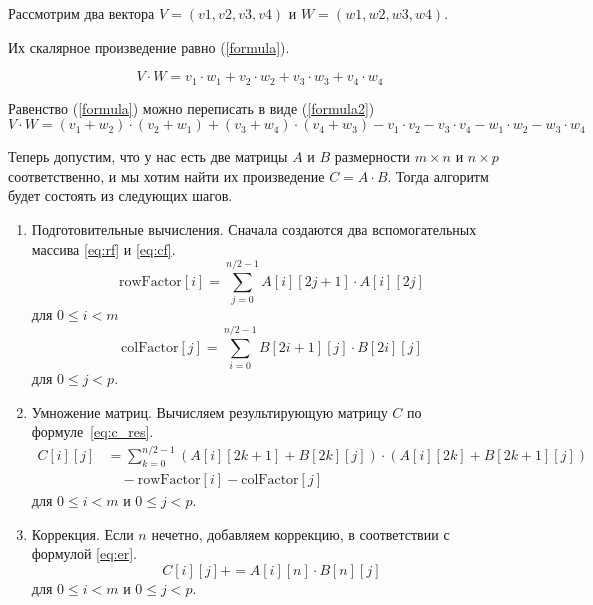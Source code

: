 Рассмотрим два вектора $V = (v1, v2, v3, v4)$ и $W = (w1, w2, w3, w4)$.  

Их скалярное произведение равно (\ref{formula}).

\begin{equation} \label{formula}
	V \cdot W=v_1 \cdot w_1 + v_2 \cdot w_2 + v_3 \cdot w_3 + v_4 \cdot w_4
\end{equation}

Равенство (\ref{formula}) можно переписать в виде (\ref{formula2}) 
\begin{equation} \label{formula2}
	V \cdot W=(v_1 + w_2) \cdot (v_2 + w_1) + (v_3 + w_4) \cdot (v_4 + w_3) - v_1 \cdot v_2 - v_3 \cdot v_4 - w_1 \cdot w_2 - w_3 \cdot w_4
\end{equation}

Теперь допустим, что у нас есть две матрицы $A$ и $B$ размерности $m \times n$ и $n \times p$ соответственно, и мы хотим найти их произведение $C = A \cdot B$.
Тогда алгоритм будет состоять из следующих шагов.

\begin{enumerate}
	\item Подготовительные вычисления. Сначала создаются два вспомогательных массива \eqref{eq:rf} и \eqref{eq:cf}.
	\begin{equation}
	\label{eq:rf}
	\text{{rowFactor}}[i] = \sum_{j=0}^{n/2 - 1} A[i][2j+1] \cdot A[i][2j]
	\end{equation}
	для \(0 \leq i < m\)
	\begin{equation}
	\label{eq:cf}
	\text{{colFactor}}[j] = \sum_{i=0}^{n/2 - 1} B[2i+1][j] \cdot B[2i][j]
	\end{equation}
	для \(0 \leq j < p\).
	
	\item Умножение матриц. Вычисляем результирующую матрицу $C$ по формуле~\eqref{eq:c_res}.
	\begin{equation}
		\label{eq:c_res}
		\begin{aligned}
			C[i][j] &= \sum_{k=0}^{n/2 - 1} (A[i][2k+1] + B[2k][j]) \cdot (A[i][2k] + B[2k+1][j]) \\
			&\quad - \text{{rowFactor}}[i] - \text{{colFactor}}[j]
		\end{aligned}
	\end{equation}
	для \(0 \leq i < m\) и \(0 \leq j < p\).
	
	\item Коррекция. Если \(n\) нечетно, добавляем коррекцию, в соответствии с формулой \eqref{eq:er}.
	\begin{equation}
		\label{eq:er}
	C[i][j] += A[i][n] \cdot B[n][j]
	\end{equation}
	для \(0 \leq i < m\) и \(0 \leq j < p\). 
\end{enumerate}

